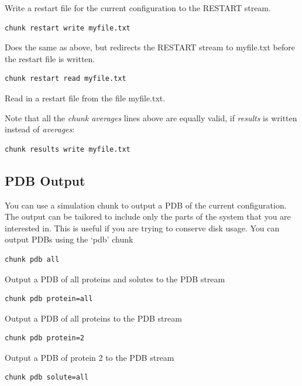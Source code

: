 \documentclass[letterpaper,10pt,english]{manual}
\begin{document}
Write a restart file for the current configuration to the RESTART stream.

\begin{Verbatim}[commandchars=@\[\]]
chunk restart write myfile.txt
\end{Verbatim}

Does the same as above, but redirects the RESTART stream to myfile.txt before the restart file is written.

\begin{Verbatim}[commandchars=@\[\]]
chunk restart read myfile.txt
\end{Verbatim}

Read in a restart file from the file myfile.txt.

Note that all the \emph{chunk averages} lines above are equally valid, if \emph{results} is written instead of \emph{averages}:

\begin{Verbatim}[commandchars=@\[\]]
chunk results write myfile.txt
\end{Verbatim}


\subsection{PDB Output}
You can use a simulation chunk to output a PDB of the current configuration. The output can be tailored to include only the parts of the system that you are interested in. This is useful if you are trying to conserve disk usage. You can output PDBs using the ‘pdb’ chunk

\begin{Verbatim}[commandchars=@\[\]]
chunk pdb all
\end{Verbatim}

Output a PDB of all proteins and solutes to the PDB stream

\begin{Verbatim}[commandchars=@\[\]]
chunk pdb protein=all
\end{Verbatim}

Output a PDB of all proteins to the PDB stream

\begin{Verbatim}[commandchars=@\[\]]
chunk pdb protein=2
\end{Verbatim}

Output a PDB of protein 2 to the PDB stream

\begin{Verbatim}[commandchars=@\[\]]
chunk pdb solute=all
\end{Verbatim}
\end{document}
